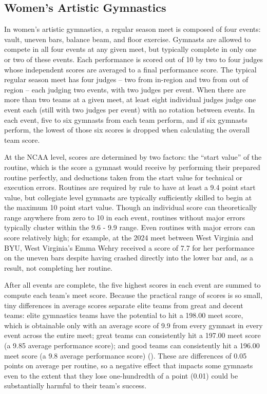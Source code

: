 \documentclass[12pt]{article}
\begin{document}
\subsection{Women's Artistic Gymnastics}
In women’s artistic gymnastics, a regular season meet is composed of four events: vault, uneven bars, balance beam, and floor exercise. Gymnasts are allowed to compete in all four events at any given meet, but typically complete in only one or two of these events. Each performance is scored out of 10 by two to four judges whose independent scores are averaged to a final performance score. The typical regular season meet has four judges – two from in-region and two from out of region – each judging two events, with two judges per event. When there are more than two teams at a given meet, at least eight individual judges judge one event each (still with two judges per event) with no rotation between events. In each event, five to six gymnasts from each team perform, and if six gymnasts perform, the lowest of those six scores is dropped when calculating the overall team score. 

At the NCAA level, scores are determined by two factors: the “start value” of the routine, which is the score a gymnast would receive by performing their prepared routine perfectly, and deductions taken from the start value for technical or execution errors. Routines are required by rule to have at least a 9.4 point start value, but collegiate level gymnasts are typically sufficiently skilled to begin at the maximum 10 point start value. Though an individual score can theoretically range anywhere from zero to 10 in each event, routines without major errors typically cluster within the 9.6 - 9.9 range. Even routines with major errors can score relatively high; for example, at the 2024 meet between West Virginia and BYU, West Virginia's Emma Wehry received a score of 7.7 for her performance on the uneven bars despite having crashed directly into the lower bar and, as a result, not completing her routine.

After all events are complete, the five highest scores in each event are summed to compute each team’s meet score. Because the practical range of scores is so small, tiny differences in average scores separate elite teams from great and decent teams: elite gymnastics teams have the potential to hit a 198.00 meet score, which is obtainable only with an average score of 9.9 from every gymnast in every event across the entire meet; great teams can consistently hit a 197.00 meet score (a 9.85 average performance score); and good teams can consistently hit a 196.00 meet score (a 9.8 average performance score) (\citealp{grimsley_2019}). These are differences of 0.05 points on average per routine, so a negative effect that impacts some gymnasts even to the extent that they lose one-hundredth of a point (0.01) could be substantially harmful to their team's success.
\end{document}
